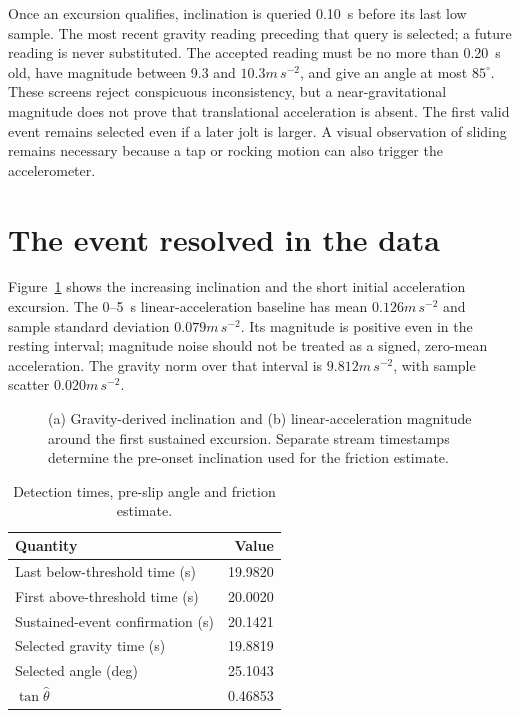 Once an excursion qualifies, inclination is queried 0.10~s before its last low sample. The most recent gravity reading preceding that query is selected; a future reading is never substituted. The accepted reading must be no more than 0.20~s old, have magnitude between 9.3 and $10.3\unit{m\,s^{-2}}$, and give an angle at most $85^\circ$. These screens reject conspicuous inconsistency, but a near-gravitational magnitude does not prove that translational acceleration is absent. The first valid event remains selected even if a later jolt is larger. A visual observation of sliding remains necessary because a tap or rocking motion can also trigger the accelerometer.

\section{The event resolved in the data}
Figure~\ref{fig:static-friction-example} shows the increasing inclination and the short initial acceleration excursion. The 0--5~s linear-acceleration baseline has mean $0.126\unit{m\,s^{-2}}$ and sample standard deviation $0.079\unit{m\,s^{-2}}$. Its magnitude is positive even in the resting interval; magnitude noise should not be treated as a signed, zero-mean acceleration. The gravity norm over that interval is $9.812\unit{m\,s^{-2}}$, with sample scatter $0.020\unit{m\,s^{-2}}$.

\begin{figure}[t]
\centering

\caption{(a) Gravity-derived inclination and (b) linear-acceleration magnitude around the first sustained excursion. Separate stream timestamps determine the pre-onset inclination used for the friction estimate.}
\label{fig:static-friction-example}
\end{figure}

\begin{table}[t]
\caption{Detection times, pre-slip angle and friction estimate.}
\label{tab:static-friction-event}
\centering\small
\begin{tabular}{@{}lr@{}}
\toprule
Quantity & Value\\
\midrule
Last below-threshold time (s) & 19.9820\\
First above-threshold time (s) & 20.0020\\
Sustained-event confirmation (s) & 20.1421\\
Selected gravity time (s) & 19.8819\\
Selected angle (deg) & 25.1043\\
$\tan\hat\theta$ & 0.46853\\
\bottomrule
\end{tabular}
\end{table}

